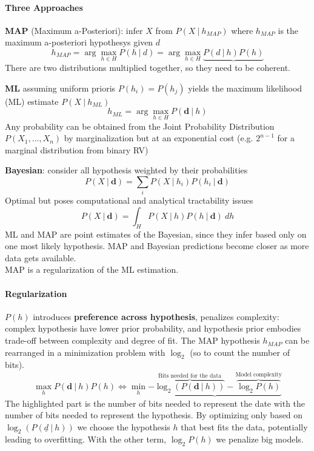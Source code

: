 \documentclass[10pt]{report}
\begin{document}
\paragraph{Three Approaches}
\begin{list}{}{}
	\item \textbf{MAP} (Maximum a-Posteriori): infer $X$ from $P(X\:|\:h_{MAP})$ where $h_{MAP}$ is the maximum a-posteriori hypothesys given $d$
$$h_{MAP} = \arg\max_{h\in H} P(h\:|\:d) = \arg\max_{h\in H}\underbrace{ P(d\:|\:h)P(h)}$$
There are two distributions multiplied together, so they need to be coherent.
	\item \textbf{ML} assuming uniform prioris $P(h_i)=P(h_j)$ yields the maximum likelihood (ML) estimate $P(X\:|\:h_{ML})$ $$h_{ML} = \arg\max_{h\in H} P(\mathbf{d}\:|\:h)$$
Any probability can be obtained from the Joint Probability Distribution $P(X_1,\ldots,X_n)$ by marginalization but at an exponential cost (e.g. $2^{n-1}$ for a marginal distribution from binary RV)
	\item \textbf{Bayesian}: consider all hypothesis weighted by their probabilities
$$P(X\:|\:\mathbf{d})=\sum_i P(X\:|\:h_i)P(h_i\:|\:\mathbf{d})$$
Optimal but poses computational and analytical tractability issues
$$P(X\:|\:\mathbf{d}) = \int_H P(X\:|\:h)P(h\:|\:\mathbf{d})\:dh$$
	ML and MAP are point estimates of the Bayesian, since they infer based only on one most likely hypothesis. MAP and Bayesian predictions become closer as more data gets available.\\
	MAP is a regularization of the ML estimation.
\end{list}
\paragraph{Regularization} $P(h)$ introduces \textbf{preference across hypothesis}, penalizes complexity: complex hypothesis have lower prior probability, and hypothesis prior embodies trade-off between complexity and degree of fit.
The MAP hypothesis $h_{MAP}$ can be rearranged in a minimization problem with $\log_2$ (so to count the number of bits).
$$\max_h P(\mathbf{d}\:|\:h)P(h)\Leftrightarrow\min_h\underbrace{-\overset{\text{Bits needed for the data}}{\overbrace{\log_2(P(\mathbf{d}\:|\:h))}}-\overset{\text{Model complexity}}{\overbrace{\log_2P(h)}}}$$
The highlighted part is the number of bits needed to represent the date with the number of bits needed to represent the hypothesis. By optimizing only based on $\log_2(P(\underline{d}\:|\:h))$ we choose the hypothesis $h$ that best fits the data, potentially leading to overfitting. With the other term, $\log_2P(h)$ we penalize big models.
\end{document}
